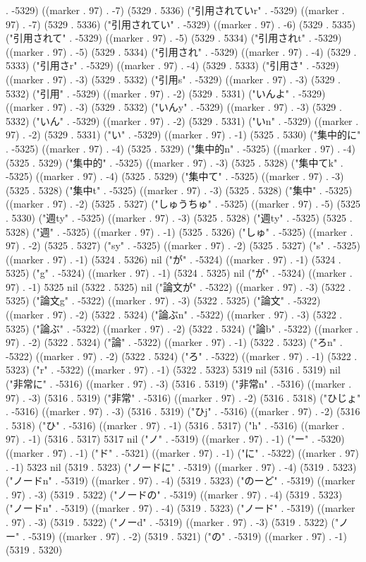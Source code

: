 . -5329) ((marker . 97) . -7) (5329 . 5336) ("引用されていr" . -5329) ((marker . 97) . -7) (5329 . 5336) ("引用されてい" . -5329) ((marker . 97) . -6) (5329 . 5335) ("引用されて" . -5329) ((marker . 97) . -5) (5329 . 5334) ("引用されt" . -5329) ((marker . 97) . -5) (5329 . 5334) ("引用され" . -5329) ((marker . 97) . -4) (5329 . 5333) ("引用さr" . -5329) ((marker . 97) . -4) (5329 . 5333) ("引用さ" . -5329) ((marker . 97) . -3) (5329 . 5332) ("引用s" . -5329) ((marker . 97) . -3) (5329 . 5332) ("引用" . -5329) ((marker . 97) . -2) (5329 . 5331) ("いんよ" . -5329) ((marker . 97) . -3) (5329 . 5332) ("いんy" . -5329) ((marker . 97) . -3) (5329 . 5332) ("いん" . -5329) ((marker . 97) . -2) (5329 . 5331) ("いn" . -5329) ((marker . 97) . -2) (5329 . 5331) ("い" . -5329) ((marker . 97) . -1) (5325 . 5330) ("集中的に" . -5325) ((marker . 97) . -4) (5325 . 5329) ("集中的n" . -5325) ((marker . 97) . -4) (5325 . 5329) ("集中的" . -5325) ((marker . 97) . -3) (5325 . 5328) ("集中てk" . -5325) ((marker . 97) . -4) (5325 . 5329) ("集中て" . -5325) ((marker . 97) . -3) (5325 . 5328) ("集中t" . -5325) ((marker . 97) . -3) (5325 . 5328) ("集中" . -5325) ((marker . 97) . -2) (5325 . 5327) ("しゅうちゅ" . -5325) ((marker . 97) . -5) (5325 . 5330) ("週ty" . -5325) ((marker . 97) . -3) (5325 . 5328) ("週ty" . -5325) (5325 . 5328) ("週" . -5325) ((marker . 97) . -1) (5325 . 5326) ("しゅ" . -5325) ((marker . 97) . -2) (5325 . 5327) ("sy" . -5325) ((marker . 97) . -2) (5325 . 5327) ("s" . -5325) ((marker . 97) . -1) (5324 . 5326) nil ("が" . -5324) ((marker . 97) . -1) (5324 . 5325) ("g" . -5324) ((marker . 97) . -1) (5324 . 5325) nil ("が" . -5324) ((marker . 97) . -1) 5325 nil (5322 . 5325) nil ("論文が" . -5322) ((marker . 97) . -3) (5322 . 5325) ("論文g" . -5322) ((marker . 97) . -3) (5322 . 5325) ("論文" . -5322) ((marker . 97) . -2) (5322 . 5324) ("論ぶn" . -5322) ((marker . 97) . -3) (5322 . 5325) ("論ぶ" . -5322) ((marker . 97) . -2) (5322 . 5324) ("論b" . -5322) ((marker . 97) . -2) (5322 . 5324) ("論" . -5322) ((marker . 97) . -1) (5322 . 5323) ("ろn" . -5322) ((marker . 97) . -2) (5322 . 5324) ("ろ" . -5322) ((marker . 97) . -1) (5322 . 5323) ("r" . -5322) ((marker . 97) . -1) (5322 . 5323) 5319 nil (5316 . 5319) nil ("非常に" . -5316) ((marker . 97) . -3) (5316 . 5319) ("非常n" . -5316) ((marker . 97) . -3) (5316 . 5319) ("非常" . -5316) ((marker . 97) . -2) (5316 . 5318) ("ひじょ" . -5316) ((marker . 97) . -3) (5316 . 5319) ("ひj" . -5316) ((marker . 97) . -2) (5316 . 5318) ("ひ" . -5316) ((marker . 97) . -1) (5316 . 5317) ("h" . -5316) ((marker . 97) . -1) (5316 . 5317) 5317 nil ("ノ" . -5319) ((marker . 97) . -1) ("ー" . -5320) ((marker . 97) . -1) ("ド" . -5321) ((marker . 97) . -1) ("に" . -5322) ((marker . 97) . -1) 5323 nil (5319 . 5323) ("ノードに" . -5319) ((marker . 97) . -4) (5319 . 5323) ("ノードn" . -5319) ((marker . 97) . -4) (5319 . 5323) ("のーど" . -5319) ((marker . 97) . -3) (5319 . 5322) ("ノードの" . -5319) ((marker . 97) . -4) (5319 . 5323) ("ノードn" . -5319) ((marker . 97) . -4) (5319 . 5323) ("ノード" . -5319) ((marker . 97) . -3) (5319 . 5322) ("ノーd" . -5319) ((marker . 97) . -3) (5319 . 5322) ("ノー" . -5319) ((marker . 97) . -2) (5319 . 5321) ("の" . -5319) ((marker . 97) . -1) (5319 . 5320) 